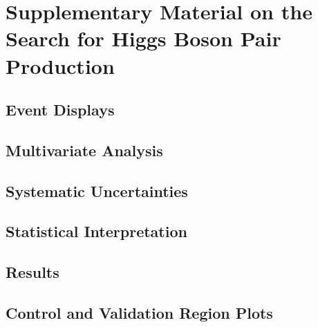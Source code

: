 \chapter{Supplementary Material on the Search for Higgs Boson Pair Production}

\section{Event Displays}%
\label{app:event_displays}

\clearpage

\section{Multivariate Analysis}%
\label{app:multivariate_analysis}

\clearpage

\section{Systematic Uncertainties}%
\label{app:uncertainties}

\clearpage

\section{Statistical Interpretation}%
\label{app:statistical_interpretation}

\clearpage

\section{Results}%
\label{app:results}

\clearpage

\section{Control and Validation Region Plots}%
\label{app:control_and_validation_regions}

\clearpage

% 

